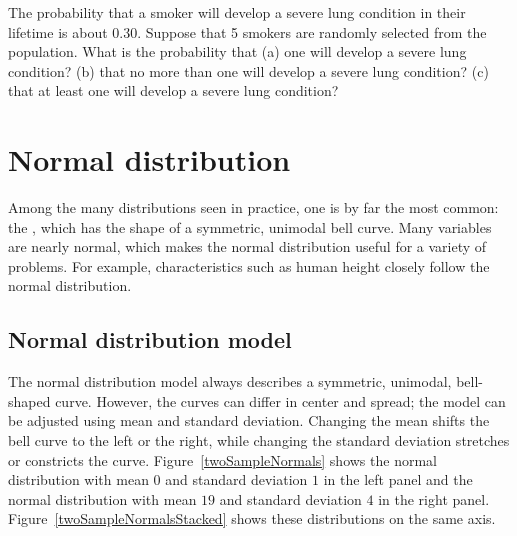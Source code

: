 \begin{exercisewrap}
\begin{nexercise}
The probability that a smoker will develop a severe lung condition in their lifetime is about 0.30. Suppose that 5 smokers are randomly selected from the population. What is the probability that (a) one will develop a severe lung condition? (b) that no more than one will develop a severe lung condition? (c) that at least one will develop a severe lung condition?\footnotemark{}
\end{nexercise}
\end{exercisewrap}



\section{Normal distribution}
\label{normalDist}


Among the many distributions seen in practice, one is by far the most common: the , which has the shape of a symmetric, unimodal bell curve. Many variables are nearly normal, which makes the normal distribution useful for a variety of problems. For example, characteristics such as human height closely follow the normal distribution.


\subsection{Normal distribution model}

The normal distribution model always describes a symmetric, unimodal, bell-shaped curve. However, the curves can differ in center and spread; the model can be adjusted using mean and standard deviation. Changing the mean shifts the bell curve to the left or the right, while changing the standard deviation stretches or constricts the curve. Figure~\ref{twoSampleNormals} shows the normal distribution with mean $0$ and standard deviation $1$ in the left panel and the normal distribution with mean $19$ and standard deviation $4$ in the right panel. Figure~\ref{twoSampleNormalsStacked} shows these distributions on the same axis.

